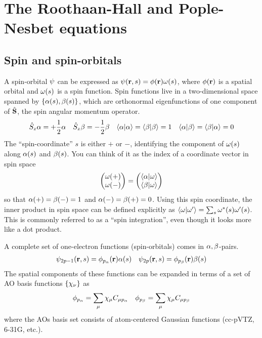 \documentclass[11pt]{article}
\numberwithin{equation}{section}
\begin{document}
\setlength{\abovedisplayskip}{3pt}
\setlength{\belowdisplayskip}{3pt}

\setcounter{section}{1}
\section{The Roothaan-Hall and Pople-Nesbet equations}

\subsection{Spin and spin-orbitals}


A spin-orbital $\psi $ can be expressed as $\psi (\mathbf{r},s)=\phi (\mathbf{r})\omega (s)$, where $\phi (\mathbf{r})$ is a spatial orbital and $\omega (s)$ is a spin function.
Spin functions live in a two-dimensional space spanned by $\{\alpha (s),\beta (s)\}$, which are orthonormal eigenfunctions of one component of $\hat{\mathbf{S}}$, the spin angular momentum operator.
\begin{align}
  \hat{S}_z\alpha 
=
  +\frac {1}{2}\alpha 
&&
  \hat{S}_z\beta 
=
  -\frac {1}{2}\beta 
&&
  \langle\alpha |\alpha \rangle=\langle\beta |\beta \rangle=1
&&
  \langle\alpha |\beta \rangle=\langle\beta |\alpha \rangle=0
\end{align}
The ``spin-coordinate'' $s$ is either $+$ or $-$, identifying the component of $\omega (s)$ along $\alpha (s)$ and $\beta (s)$.
You can think of it as the index of a coordinate vector in spin space
\begin{align*}
  \ma{\w(+)\\\w(-)}
=
  \ma{\ip{\a|\w}\\\ip{\b|\w}}
\end{align*}
so that $\alpha (+)=\beta (-)=1$ and $\alpha (-)=\beta (+)=0$.
Using this spin coordinate, the inner product in spin space can be defined explicitly as $\langle\omega |\omega '\rangle=\sum_s\omega ^*(s)\omega '(s)$.
This is commonly referred to as a ``spin integration'', even though it looks more like a dot product.

A complete set of one-electron functions (spin-orbitals) comes in $\alpha ,\beta $-pairs.
\begin{align}\label{eq:spin-orb-general}
	\psi _{2p-1}(\mathbf{r},s)
=
  \phi _{p_{\alpha }}(\mathbf{r})\alpha (s)
&&
  \psi _{2p}(\mathbf{r},s)
=
  \phi _{p_{\beta }}(\mathbf{r})\beta (s)
\end{align}
The spatial components of these functions can be expanded in terms of a set of AO basis functions $\{\x_\nu\}$ as 
\begin{align}\label{eq:space-orb}
  \f_{p_\a}
=
  \sum_\mu \x_\mu C_{\mu p_\a}
&&
  \f_{p_\b}
=
  \sum_\mu \x_\mu C_{\mu p_\b}
\end{align}
where the AOs basis set consists of atom-centered Gaussian functions (cc-pVTZ, 6-31G, etc.).
\end{document}
